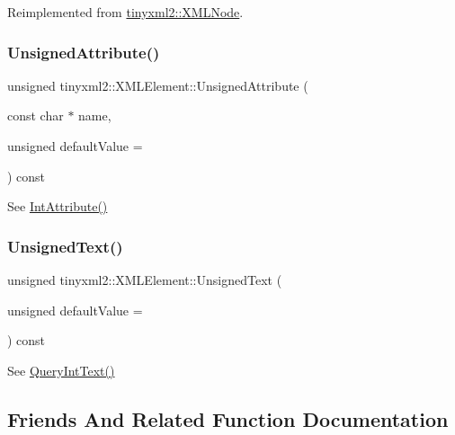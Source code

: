 Reimplemented from \hyperlink{classtinyxml2_1_1_x_m_l_node_a2c5c843b8f37306f15994ebe882b9346}{tinyxml2\+::\+X\+M\+L\+Node}.

\mbox{\label{classtinyxml2_1_1_x_m_l_element_afea43a1d4aa33e3703ddee5fc9adc26c}} 
\subsubsection{\texorpdfstring{Unsigned\+Attribute()}{UnsignedAttribute()}}
{\footnotesize\ttfamily unsigned tinyxml2\+::\+X\+M\+L\+Element\+::\+Unsigned\+Attribute (\begin{DoxyParamCaption}\item[{const char $\ast$}]{name,  }\item[{unsigned}]{default\+Value = {} }\end{DoxyParamCaption}) const}



See \hyperlink{classtinyxml2_1_1_x_m_l_element_a95a89b13bb14a2d4655e2b5b406c00d4}{Int\+Attribute()} 

\mbox{\label{classtinyxml2_1_1_x_m_l_element_a49bad014ffcc17b0b6119d5b2c97dfb5}} 
\subsubsection{\texorpdfstring{Unsigned\+Text()}{UnsignedText()}}
{\footnotesize\ttfamily unsigned tinyxml2\+::\+X\+M\+L\+Element\+::\+Unsigned\+Text (\begin{DoxyParamCaption}\item[{unsigned}]{default\+Value = {} }\end{DoxyParamCaption}) const}



See \hyperlink{classtinyxml2_1_1_x_m_l_element_a926357996bef633cb736e1a558419632}{Query\+Int\+Text()} 



\subsection{Friends And Related Function Documentation}
\mbox{\label{classtinyxml2_1_1_x_m_l_element_a4eee3bda60c60a30e4e8cd4ea91c4c6e}} 
